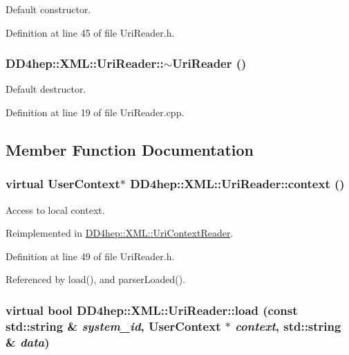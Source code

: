 Default constructor. 

Definition at line 45 of file UriReader.h.\hypertarget{class_d_d4hep_1_1_x_m_l_1_1_uri_reader_af8a3cc8ac2e0a5c0f2ea45c3894a2582}{
\subsubsection[{$\sim$UriReader}]{\setlength{\rightskip}{0pt plus 5cm}DD4hep::XML::UriReader::$\sim$UriReader ()}}
\label{class_d_d4hep_1_1_x_m_l_1_1_uri_reader_af8a3cc8ac2e0a5c0f2ea45c3894a2582}


Default destructor. 

Definition at line 19 of file UriReader.cpp.

\subsection{Member Function Documentation}
\hypertarget{class_d_d4hep_1_1_x_m_l_1_1_uri_reader_a9f8d06469b3e5bf1e69c72c4285dfcac}{
\subsubsection[{context}]{\setlength{\rightskip}{0pt plus 5cm}virtual {\bf UserContext}$\ast$ DD4hep::XML::UriReader::context ()}}
\label{class_d_d4hep_1_1_x_m_l_1_1_uri_reader_a9f8d06469b3e5bf1e69c72c4285dfcac}


Access to local context. 

Reimplemented in \hyperlink{class_d_d4hep_1_1_x_m_l_1_1_uri_context_reader_ad7ba7d778fdc8df96cca1e298003a403}{DD4hep::XML::UriContextReader}.

Definition at line 49 of file UriReader.h.

Referenced by load(), and parserLoaded().\hypertarget{class_d_d4hep_1_1_x_m_l_1_1_uri_reader_a80a35ded7f30ba3b1954edb0e0493d6f}{
\subsubsection[{load}]{\setlength{\rightskip}{0pt plus 5cm}virtual bool DD4hep::XML::UriReader::load (const std::string \& {\em system\_\-id}, \/  {\bf UserContext} $\ast$ {\em context}, \/  std::string \& {\em data})}}
\label{class_d_d4hep_1_1_x_m_l_1_1_uri_reader_a80a35ded7f30ba3b1954edb0e0493d6f}


